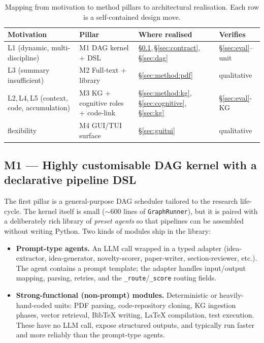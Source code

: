 \documentclass{article}
\newcommand{\code}[1]{\texttt{\small #1}}
\begin{document}
\begin{table}[t]
\centering
\caption{Mapping from motivation to method pillars to architectural
realisation. Each row is a self-contained design move.}
\label{tab:method-map}
\small
\setlength{\tabcolsep}{4pt}
\begin{tabular}{l l l l}
\toprule
\textbf{Motivation} & \textbf{Pillar} & \textbf{Where realised} & \textbf{Verifies} \\
\midrule
L1 (dynamic, multi-discipline) & M1 DAG kernel + DSL & \S\ref{sec:method:dag},\,\S\ref{sec:contract},\,\S\ref{sec:dag} & \S\ref{sec:eval}--unit \\
L3 (summary insufficient)      & M2 Full-text + library & \S\ref{sec:method:pdf} & qualitative \\
L2,\,L4,\,L5 (context, code, accumulation) & M3 KG + cognitive roles + code-link & \S\ref{sec:method:kg},\,\S\ref{sec:cognitive},\,\S\ref{sec:kg} & \S\ref{sec:eval}-KG \\
flexibility                    & M4 GUI/TUI surface & \S\ref{sec:guitui} & qualitative \\
\bottomrule
\end{tabular}
\end{table}

\subsection{M1 --- Highly customisable DAG kernel with a declarative pipeline DSL}
\label{sec:method:dag}

The first pillar is a general-purpose DAG scheduler tailored to the
research life-cycle. The kernel itself is small ($\sim\!600$ lines of
\code{GraphRunner}), but it is paired with a deliberately rich library
of \emph{preset agents} so that pipelines can be assembled without
writing Python. Two kinds of modules ship in the library:

\begin{itemize}[leftmargin=1.4em,itemsep=0.15em]
\item \textbf{Prompt-type agents.} An LLM call wrapped in a typed
adapter (idea-extractor, idea-generator, novelty-scorer, paper-writer,
section-reviewer, etc.). The agent contains a prompt template; the
adapter handles input/output mapping, parsing, retries, and the
\code{\_route}/\code{\_score} routing fields.
\item \textbf{Strong-functional (non-prompt) modules.} Deterministic or
heavily-hand-coded units: PDF parsing, code-repository cloning, KG
ingestion phases, vector retrieval, BibTeX writing, LaTeX compilation,
test execution. These have no LLM call, expose structured outputs, and
typically run faster and more reliably than the prompt-type agents.
\end{itemize}
\end{document}
